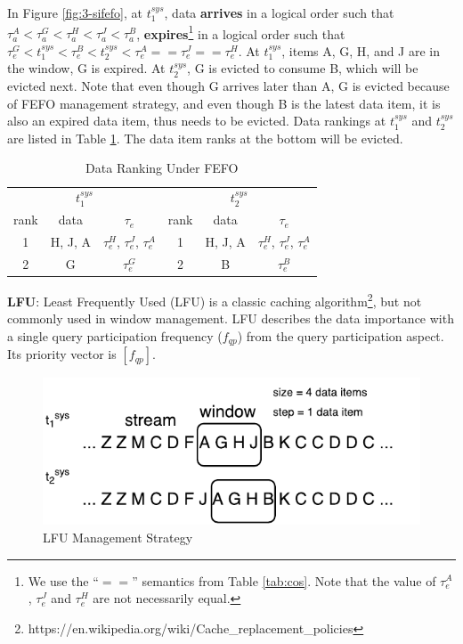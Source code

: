 In Figure \ref{fig:3-sifefo}, at $t^{sys}_{1}$, data \textbf{arrives} in a logical order such that $\tau^{A}_{a} < \tau^{G}_{a} < \tau^{H}_{a} < \tau^{J}_{a} < \tau^{B}_{a}$, \textbf{expires}\footnote{We use the ``$==$'' semantics from Table \ref{tab:cos}. Note that the value of $\tau^{A}_{e}$, $\tau^{J}_{e}$ and $\tau^{H}_{e}$ are not necessarily equal.} in a logical order such that $\tau^{G}_{e} < t^{sys}_{1} < \tau^{B}_{e} < t^{sys}_{2} < \tau^{A}_{e} == \tau^{J}_{e} == \tau^{H}_{e}$.
At $t^{sys}_{1}$, items A, G, H, and J are in the window, G is expired.
At $t^{sys}_{2}$, G is evicted to consume B, which will be evicted next. 
Note that even though G arrives later than A, G is evicted because of FEFO management strategy,
and even though B is the latest data item, it is also an expired data item, thus needs to be evicted. 
Data rankings at $t^{sys}_{1}$ and $t^{sys}_{2}$ are listed in Table \ref{tab:fefo}. 
The data item ranks at the bottom will be evicted. 

\begin{table}[!htbp]
\centering
\caption{Data Ranking Under FEFO}
\label{tab:fefo}
\begin{tabular}{|c|c|c||c|c|c|}
\hline
\multicolumn{3}{|c||}{$t^{sys}_{1}$} & \multicolumn{3}{c|}{$t^{sys}_{2}$} \\ \hhline{|======|}
rank & data & $\tau_{e}$ & rank & data & $\tau_{e}$ \\ \hhline{|=|=|=#=|=|=|}
1 & H, J, A & $\tau^{H}_{e}$, $\tau^{J}_{e}$, $\tau^{A}_{e}$ & 1 & H, J, A & $\tau^{H}_{e}$, $\tau^{J}_{e}$, $\tau^{A}_{e}$ \\ \hline
2 & G & $\tau^{G}_{e}$ & 2 & B & $\tau^{B}_{e}$ \\ \hline
\end{tabular}
\end{table}

\textbf{LFU}:
Least Frequently Used (LFU) is a classic caching algorithm\footnote{https://en.wikipedia.org/wiki/Cache\_replacement\_policies}, but not commonly used in window management.
LFU describes the data importance with a single query participation frequency ($f_{qp}$) from the query participation aspect. 
Its priority vector is $[f_{qp}]$.

\begin{figure}[!htbp]
	\centering
    \includegraphics[width=5in]{img/3-silfu.pdf}
    \caption{LFU Management Strategy}
    \label{fig:3-silfu}
\end{figure}

